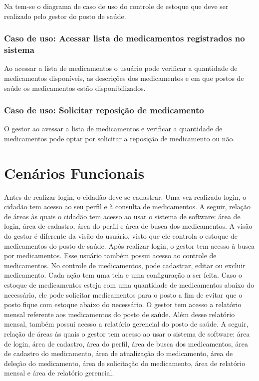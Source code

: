 Na  tem-se o diagrama de caso de uso do controle de estoque que deve ser realizado pelo gestor do posto de saúde.



\subsubsection{Caso de uso: Acessar lista de medicamentos registrados no sistema}

Ao acessar a lista de medicamentos o usuário pode verificar a quantidade de medicamentos disponíveis, as descrições dos medicamentos e em que postos de saúde os medicamentos estão disponibilizados.

\subsubsection{Caso de uso: Solicitar reposição de medicamento}

O gestor ao avessar a lista de medicamentos e verificar a quantidade de medicamentos pode optar por solicitar a reposição de medicamento ou não.



\section{Cenários Funcionais}

Antes de realizar login, o cidadão deve se cadastrar. Uma vez realizado login, o cidadão tem acesso ao seu perfil e à consulta de medicamentos. A seguir, relação de áreas às quais o cidadão tem acesso ao usar o sistema de software: área de login, área de cadastro, área do perfil e área de busca dos medicamentos. A visão do gestor é diferente da visão do usuário, visto que ele controla o estoque de medicamentos do posto de saúde. Após realizar login, o gestor tem acesso à busca por medicamentos. Esse usuário também possui acesso ao controle de medicamentos. No controle de medicamentos, pode cadastrar, editar ou excluir medicamento. Cada ação tem uma tela e uma configuração a ser feita. Caso o estoque de medicamentos esteja com uma quantidade de medicamentos abaixo do necessário, ele pode solicitar medicamentos para o posto a fim de evitar que o posto fique com estoque abaixo do necessário. O gestor tem acesso a relatório mensal referente aos medicamentos do posto de saúde. Além desse relatório mensal, também possui acesso a relatório gerencial do posto de saúde. A seguir, relação de áreas às quais o gestor tem acesso ao usar o sistema de software: área de login, área de cadastro, área do perfil, área de busca dos medicamentos, área de cadastro do medicamento, área de atualização do medicamento, área de deleção do medicamento, área de solicitação do medicamento, área de relatório mensal e área de relatório gerencial.

